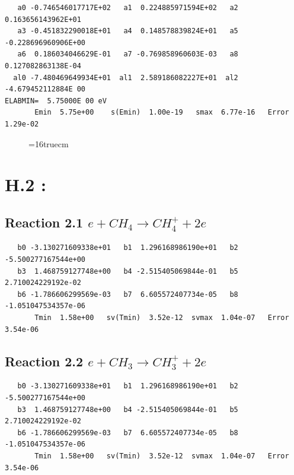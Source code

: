 \documentclass[12pt,dvipdfmx]{article}
\begin{document}
\begin{small}\begin{verbatim}
   a0 -0.746546017717E+02   a1  0.224885971594E+02   a2  0.163656143962E+01
   a3 -0.451832290018E+01   a4  0.148578839824E+01   a5 -0.228696960906E+00
   a6  0.186034046629E-01   a7 -0.769858960603E-03   a8  0.127082863138E-04
  al0 -7.480469649934E+01  al1  2.589186082227E+01  al2 -4.679452112884E 00
ELABMIN=  5.75000E 00 eV
       Emin  5.75e+00    s(Emin)  1.00e-19   smax  6.77e-16   Error  1.29e-02
\end{verbatim}\end{small}

\begin{figure} \label{met.1_3.2}
\epsfxsize=16truecm
\end{figure}
\newpage



\section{H.2 :}



\subsection{
Reaction 2.1       $e + CH_4 \rightarrow CH_4^+ + 2e $
}

\begin{small}\begin{verbatim}
   b0 -3.130271609338e+01   b1  1.296168986190e+01   b2 -5.500277167544e+00
   b3  1.468759127748e+00   b4 -2.515405069844e-01   b5  2.710024229192e-02
   b6 -1.786606299569e-03   b7  6.605572407734e-05   b8 -1.051047534357e-06
       Tmin  1.58e+00   sv(Tmin)  3.52e-12  svmax  1.04e-07   Error  3.54e-06
\end{verbatim}\end{small}

\subsection{
Reaction 2.2       $e + CH_3 \rightarrow CH_3^+ + 2e $
}

\begin{small}\begin{verbatim}
   b0 -3.130271609338e+01   b1  1.296168986190e+01   b2 -5.500277167544e+00
   b3  1.468759127748e+00   b4 -2.515405069844e-01   b5  2.710024229192e-02
   b6 -1.786606299569e-03   b7  6.605572407734e-05   b8 -1.051047534357e-06
       Tmin  1.58e+00   sv(Tmin)  3.52e-12  svmax  1.04e-07   Error  3.54e-06
\end{verbatim}\end{small}
\end{document}
